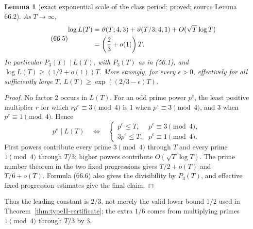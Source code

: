\documentclass[10pt,reqno]{amsart}
\newtheorem{lemma}[theorem]{Lemma}
\theoremstyle{definition}
\newcommand{\1}{\mathbf 1}
\begin{document}
\begin{lemma}[exact exponential scale of the class period; proved; source Lemma 66.2]
\label{lem:class-period}
As $T\to\infty$,
\begin{equation}\tag{66.5}
 \begin{split}
 \log L(T)&=\vartheta(T;4,3)+\vartheta(T/3;4,1)
                  +O(\sqrt T\log T)\\
          &=\left({2\over3}+o(1)\right)T.
 \end{split}
\end{equation}
In particular $P_3(T)\mid L(T)$, with $P_3(T)$ as in (56.1), and
$\log L(T)\geq(1/2+o(1))T$.  More strongly, for every $\epsilon>0$,
effectively for all sufficiently large $T$,
$L(T)\geq\exp((2/3-\epsilon)T)$.
\end{lemma}
\begin{proof}
No factor $2$ occurs in $L(T)$.  For an odd prime power $p^e$, the least
positive multiplier $r$ for which $rp^e\equiv3\pmod4$ is $1$ when
$p^e\equiv3\pmod4$, and $3$ when $p^e\equiv1\pmod4$.  Hence
\begin{equation}\tag{66.6}
 p^e\mid L(T)\quad\Longleftrightarrow\quad
 \begin{cases}
 p^e\leq T,&p^e\equiv3\pmod4,\\
 3p^e\leq T,&p^e\equiv1\pmod4.
 \end{cases}
\end{equation}
First powers contribute every prime $3\pmod4$ through $T$ and every prime
$1\pmod4$ through $T/3$; higher powers contribute
$O(\sqrt T\log T)$.  The prime number theorem in the two fixed progressions
gives $T/2+o(T)$ and $T/6+o(T)$.  Formula (66.6) also gives the divisibility
by $P_3(T)$, and effective fixed-progression estimates give the final claim.
\end{proof}
Thus the leading constant is $2/3$, not merely the valid lower bound $1/2$
used in Theorem~\ref{thm:typeII-certificate}; the extra $1/6$ comes from
multiplying primes $1\pmod4$ through $T/3$ by $3$.
\end{document}

